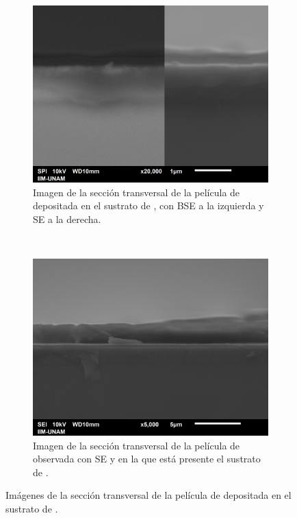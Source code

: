 \documentclass[12pt]{IEEEtran}
\begin{document}
\begin{figure}[htp]
	\centering
	\begin{subfigure}[b]{0.45\textwidth}
		\centering
		\includegraphics[width=\linewidth]{Al-transv-0004.png}
		\caption{Imagen de la sección transversal de la película de  depositada en el sustrato de , con BSE a la izquierda y SE a la derecha.}
	\end{subfigure}%
	~
	\begin{subfigure}[b]{0.45\textwidth}
		\centering
		\includegraphics[width=\linewidth]{Al-transv-0008.png}
		\caption{Imagen de la sección transversal de la película de  observada con SE y en la que está presente el sustrato de .}
	\end{subfigure}
	\caption{Imágenes de la sección transversal de la película de  depositada en el sustrato de .}
	\label{fig:SEM-trans}
\end{figure}
\end{document}
